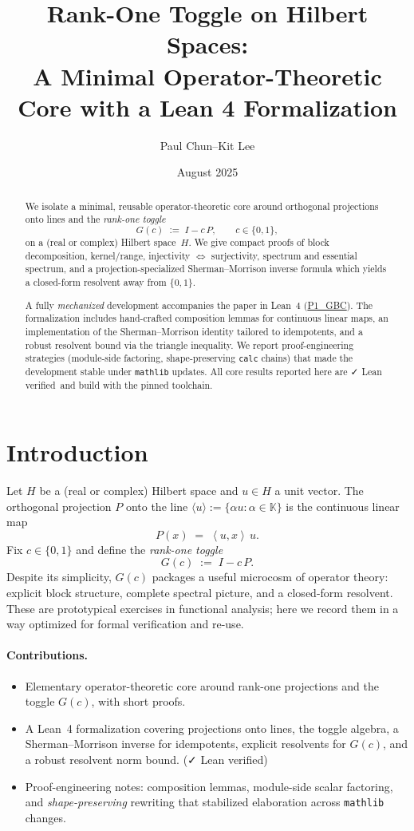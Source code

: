 \documentclass[11pt]{article}
\title{\textbf{Rank-One Toggle on Hilbert Spaces:\\
A Minimal Operator-Theoretic Core with a Lean 4 Formalization}}
\author{Paul Chun--Kit Lee}
\date{August 2025}
\theoremstyle{definition}
\newcommand{\K}{\mathbb{K}}
\newcommand{\ip}[2]{\left\langle #1,#2\right\rangle}
\newcommand{\leanRepoTag}{\href{https://github.com/AICardiologist/FoundationRelativity/tree/main/Papers/P1_GBC}{P1\_GBC}}
\newcommand{\leanok}{\textsf{\small \textcolor{green!60!black}{✓ Lean verified}}}
\begin{document}
\maketitle

\begin{abstract}
We isolate a minimal, reusable operator-theoretic core around orthogonal projections onto lines and the \emph{rank-one toggle}
\[
G(c)\;:=\;I - c\,P,\qquad c\in\{0,1\},
\]
on a (real or complex) Hilbert space~$H$. We give compact proofs of block decomposition, kernel/range, injectivity $\Leftrightarrow$ surjectivity, spectrum and essential spectrum, and a projection-specialized Sherman--Morrison inverse formula which yields a closed-form resolvent away from $\{0,1\}$. 

A fully \emph{mechanized} development accompanies the paper in Lean~4 (\leanRepoTag). The formalization includes hand-crafted composition lemmas for continuous linear maps, an implementation of the Sherman--Morrison identity tailored to idempotents, and a robust resolvent bound via the triangle inequality. We report proof-engineering strategies (module-side factoring, shape-preserving \texttt{calc} chains) that made the development stable under \texttt{mathlib} updates. All core results reported here are \leanok\ and build with the pinned toolchain.
\end{abstract}

\tableofcontents

\section{Introduction}

Let $H$ be a (real or complex) Hilbert space and $u\in H$ a unit vector. The orthogonal projection $P$ onto the line $\langle u\rangle:=\{ \alpha u : \alpha\in\K\}$ is the continuous linear map
\[
P(x) \;=\; \ip{u}{x}\,u.
\]
Fix $c\in\{0,1\}$ and define the \emph{rank-one toggle}
\[
G(c) \;:=\; I - c\,P.
\]
Despite its simplicity, $G(c)$ packages a useful microcosm of operator theory: explicit block structure, complete spectral picture, and a closed-form resolvent. These are prototypical exercises in functional analysis; here we record them in a way optimized for formal verification and re-use.

\paragraph{Contributions.}
\begin{itemize}
\item Elementary operator-theoretic core around rank-one projections and the toggle $G(c)$, with short proofs.
\item A Lean~4 formalization covering projections onto lines, the toggle algebra, a Sherman--Morrison inverse for idempotents, explicit resolvents for $G(c)$, and a robust resolvent norm bound. (\leanok)
\item Proof-engineering notes: composition lemmas, module-side scalar factoring, and \emph{shape-preserving} rewriting that stabilized elaboration across \texttt{mathlib} changes.
\end{itemize}
\end{document}
